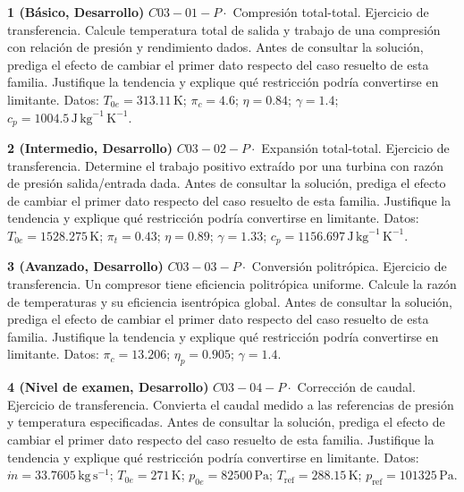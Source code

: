 \documentclass[10pt,openany]{book}
\begin{document}
\begin{tcolorbox}[title={Ejercicios propuestos}, studiumworked, breakable]

\noindent\textbf{1 (Básico, Desarrollo)}
\(C03-01-P \cdot\) Compresión total-total. Ejercicio de transferencia. Calcule temperatura total de salida y trabajo de una compresión con relación de presión y rendimiento dados. Antes de consultar la solución, prediga el efecto de cambiar el primer dato respecto del caso resuelto de esta familia. Justifique la tendencia y explique qué restricción podría convertirse en limitante. Datos: \(T_{0e}=313.11\, \mathrm{K}\); \(\pi_c=4.6\); \(\eta=0.84\); \(\gamma=1.4\); \(c_p=1004.5\, \mathrm{J}\,\mathrm{kg}^{-1}\,\mathrm{K}^{-1}\).

\noindent\textbf{2 (Intermedio, Desarrollo)}
\(C03-02-P \cdot\) Expansión total-total. Ejercicio de transferencia. Determine el trabajo positivo extraído por una turbina con razón de presión salida/entrada dada. Antes de consultar la solución, prediga el efecto de cambiar el primer dato respecto del caso resuelto de esta familia. Justifique la tendencia y explique qué restricción podría convertirse en limitante. Datos: \(T_{0e}=1528.275\, \mathrm{K}\); \(\pi_t=0.43\); \(\eta=0.89\); \(\gamma=1.33\); \(c_p=1156.697\, \mathrm{J}\,\mathrm{kg}^{-1}\,\mathrm{K}^{-1}\).

\noindent\textbf{3 (Avanzado, Desarrollo)}
\(C03-03-P \cdot\) Conversión politrópica. Ejercicio de transferencia. Un compresor tiene eficiencia politrópica uniforme. Calcule la razón de temperaturas y su eficiencia isentrópica global. Antes de consultar la solución, prediga el efecto de cambiar el primer dato respecto del caso resuelto de esta familia. Justifique la tendencia y explique qué restricción podría convertirse en limitante. Datos: \(\pi_c=13.206\); \(\eta_p=0.905\); \(\gamma=1.4\).

\noindent\textbf{4 (Nivel de examen, Desarrollo)}
\(C03-04-P \cdot\) Corrección de caudal. Ejercicio de transferencia. Convierta el caudal medido a las referencias de presión y temperatura especificadas. Antes de consultar la solución, prediga el efecto de cambiar el primer dato respecto del caso resuelto de esta familia. Justifique la tendencia y explique qué restricción podría convertirse en limitante. Datos: \(\dot m=33.7605\, \mathrm{kg}\,\mathrm{s}^{-1}\); \(T_{0e}=271\, \mathrm{K}\); \(p_{0e}=82500\, \mathrm{Pa}\); \(T_{\mathrm{ref}}=288.15\, \mathrm{K}\); \(p_{\mathrm{ref}}=101325\, \mathrm{Pa}\).
\end{tcolorbox}
\end{document}
